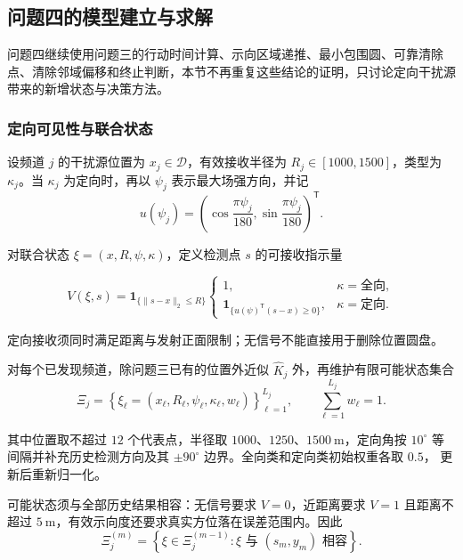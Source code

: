 \subsection{问题四的模型建立与求解}

问题四继续使用问题三的行动时间计算、示向区域递推、最小包围圆、可靠清除点、清除邻域偏移和终止判断，本节不再重复这些结论的证明，只讨论定向干扰源带来的新增状态与决策方法。

\subsubsection{定向可见性与联合状态}

设频道 $j$ 的干扰源位置为 $x_j\in\mathcal D$，有效接收半径为 $R_j\in[1000,1500]$，类型为 $\kappa_j$。当 $\kappa_j$ 为定向时，再以 $\psi_j$ 表示最大场强方向，并记
\begin{equation}
  u(\psi_j)=
  \left(
    \cos\frac{\pi\psi_j}{180},
    \sin\frac{\pi\psi_j}{180}
  \right)^{\mathsf T}.
  \label{eq:q4-direction-vector}
\end{equation}

对联合状态 $\xi=(x,R,\psi,\kappa)$，定义检测点 $s$ 的可接收指示量

\begin{equation}
  V(\xi,s)=
  \mathbf 1_{\{\|s-x\|_2\leq R\}}
  \begin{cases}
    1, & \kappa=\text{全向},\\
    \mathbf 1_{\{u(\psi)^{\mathsf T}(s-x)\geq0\}},
       & \kappa=\text{定向}.
  \end{cases}
  \label{eq:q4-visibility}
\end{equation}

定向接收须同时满足距离与发射正面限制；无信号不能直接用于删除位置圆盘。

对每个已发现频道，除问题三已有的位置外近似 $\widehat K_j$ 外，再维护有限可能状态集合
\begin{equation}
  \Xi_j=
  \left\{\xi_\ell=(x_\ell,R_\ell,\psi_\ell,
  \kappa_\ell,w_\ell)\right\}_{\ell=1}^{L_j},
  \qquad \sum_{\ell=1}^{L_j}w_\ell=1.
  \label{eq:q4-state-set}
\end{equation}

其中位置取不超过 $12$ 个代表点，半径取 $1000$、$1250$、$1500\ \mathrm m$，定向角按
$10^\circ$ 等间隔并补充历史检测方向及其 $\pm90^\circ$ 边界。全向类和定向类初始权重各取 $0.5$，
更新后重新归一化。

可能状态须与全部历史结果相容：无信号要求 $V=0$，近距离要求 $V=1$ 且距离不超过
$5\ \mathrm m$，有效示向度还要求真实方位落在误差范围内。因此
\begin{equation}
  \Xi_j^{(m)}=
  \left\{\xi\in\Xi_j^{(m-1)}:
  \xi\text{ 与 }(s_m,y_m)\text{ 相容}\right\}.
  \label{eq:q4-state-update}
\end{equation}

